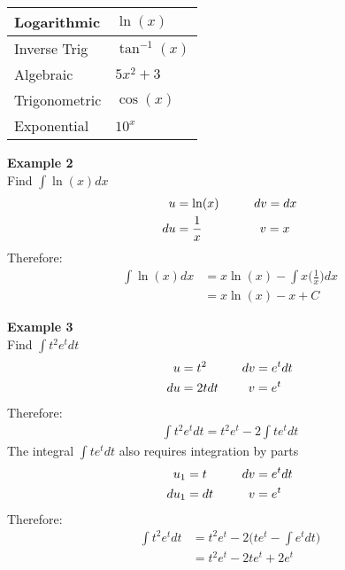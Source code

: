 \documentclass[a4paper]{article}
\let\bf\textbf
\begin{document}
\begin{center}
    \begin{tabularx}{0.3\textwidth}{
        | >{\raggedright\arraybackslash}X
        | >{\raggedright\arraybackslash}X | }
        \hline
        Logarithmic & $\ln(x)$\\
        \hline
        Inverse Trig & $\tan^{-1}(x)$\\
        \hline
        Algebraic & $5x^2 + 3$\\
        \hline
        Trigonometric & $\cos(x)$\\
        \hline
        Exponential & $10^x$\\
        \hline
    \end{tabularx}
\end{center}

\pagebreak

\begin{shaded}
    \noindent\bf{Example 2}
    \vspace{2mm}\\
    Find $\displaystyle\int \ln(x)dx$
    \begin{align*}
        u &= \ln(x) \hspace{10mm} dv = dx\\
        du &= \frac{1}{x} \hspace{16.5mm} v = x
    \end{align*}
    Therefore:
    \begin{align*}
        \int \ln(x)dx &= x\ln(x) - \int x\bigg(\frac{1}{x}\bigg)dx\\
        &= x\ln(x) - x + C
    \end{align*}
\end{shaded}

\begin{shaded}
    \noindent\bf{Example 3}
    \vspace{2mm}\\
    Find $\displaystyle\int t^2e^t dt$
    \begin{align*}
        u &= t^2 \hspace{10mm} dv = e^tdt\\
        du &= 2tdt \hspace{8.5mm} v = e^t
    \end{align*}
    Therefore:
    \begin{align*}
        \int t^2e^tdt = t^2e^t - 2\int te^tdt
    \end{align*}
    The integral $\displaystyle\int te^tdt$ also requires integration by parts
    \begin{align*}
        u_1 &= t \hspace{10mm} dv = e^tdt\\
        du_1 &= dt \hspace{10mm} v = e^t
    \end{align*}
    Therefore:
    \begin{align*} 
        \int t^2e^tdt &= t^2e^t - 2\Big(te^t - \int e^tdt \Big)\\
        &= t^2e^t - 2te^t + 2e^t
    \end{align*}
\end{shaded}
\end{document}
